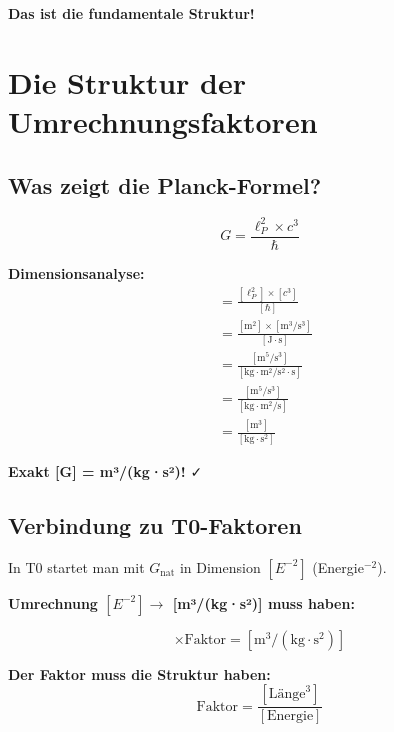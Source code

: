	\textbf{Das ist die fundamentale Struktur!}
	
	\section{Die Struktur der Umrechnungsfaktoren}
	
	\subsection{Was zeigt die Planck-Formel?}
	
	\begin{formula}
		\begin{equation}
			\boxed{G = \frac{\ell_P^2 \times c^3}{\hbar}}
		\end{equation}
		
		\textbf{Dimensionsanalyse:}
		\begin{align}
			[G] &= \frac{[\ell_P^2] \times [c^3]}{[\hbar]} \\
			&= \frac{[\text{m}^2] \times [\text{m}^3/\text{s}^3]}{[\text{J} \cdot \text{s}]} \\
			&= \frac{[\text{m}^5/\text{s}^3]}{[\text{kg} \cdot \text{m}^2/\text{s}^2 \cdot \text{s}]} \\
			&= \frac{[\text{m}^5/\text{s}^3]}{[\text{kg} \cdot \text{m}^2/\text{s}]} \\
			&= \frac{[\text{m}^3]}{[\text{kg} \cdot \text{s}^2]}
		\end{align}
		
		\textbf{Exakt [G] = m³/(kg·s²)!} ✓
	\end{formula}
	
	\subsection{Verbindung zu T0-Faktoren}
	
	In T0 startet man mit $G_{\text{nat}}$ in Dimension $[E^{-2}]$ (Energie$^{-2}$).
	
	\textbf{Umrechnung $[E^{-2}] \to$ [m³/(kg·s²)] muss haben:}
	
	\begin{equation}
		[E^{-2}] \times \text{Faktor} = [\text{m}^3/(\text{kg} \cdot \text{s}^2)]
	\end{equation}
	
	\textbf{Der Faktor muss die Struktur haben:}
	\begin{equation}
		\text{Faktor} = \frac{[\text{Länge}^3]}{[\text{Energie}]}
	\end{equation}
	
